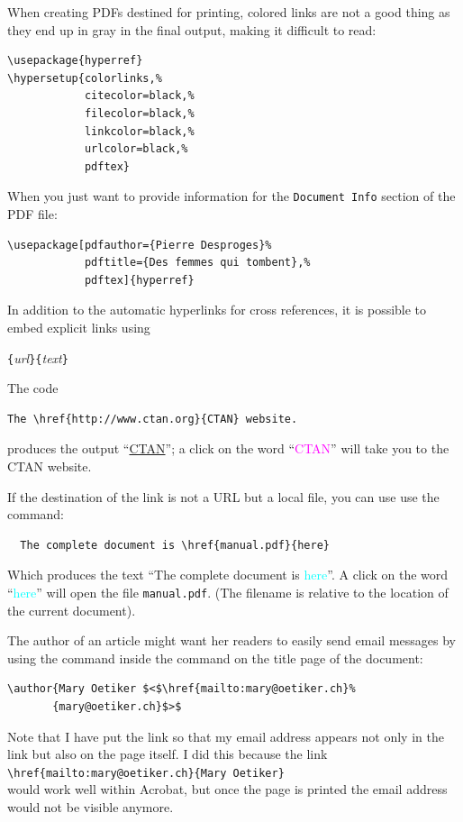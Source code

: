 \documentclass[twoside,11pt,letterpaper]{article}
\begin{document}
When creating PDFs destined for printing, colored links are not a
  good thing as they end up in gray in the final output, making it
  difficult to read:
\begin{code}
\begin{verbatim}
\usepackage{hyperref}
\hypersetup{colorlinks,%
            citecolor=black,%
            filecolor=black,%
            linkcolor=black,%
            urlcolor=black,%
            pdftex}
\end{verbatim}
\end{code}

When you just want to provide information for the
  \texttt{Document Info} section of the PDF file:
\begin{code}
\begin{verbatim}
\usepackage[pdfauthor={Pierre Desproges}%
            pdftitle={Des femmes qui tombent},%
            pdftex]{hyperref}
\end{verbatim}
\end{code}

\vspace{\baselineskip}

In addition to the automatic hyperlinks for cross references, it is
possible to embed explicit links using
\begin{lscommand}
\verb|{|\emph{url}\verb|}{|\emph{text}\verb|}|
\end{lscommand}

The code
\begin{code}
\begin{verbatim}
The \href{http://www.ctan.org}{CTAN} website.
\end{verbatim}
\end{code}
produces the output ``\href{http://www.ctan.org}{CTAN}'';
a click on the word ``\textcolor{magenta}{CTAN}''
will take you to the CTAN website.

If the destination of the link is not a URL but a local file,
  you can use use the  command: 
\begin{verbatim}
  The complete document is \href{manual.pdf}{here}
\end{verbatim}
Which produces the text ``The complete document is \textcolor{cyan}{here}''.
A click on the word
``\textcolor{cyan}{here}''
will open the file \texttt{manual.pdf}. (The filename is relative to
the location of the current document).

The author of an article might want her readers to easily send
  email messages by using the  command inside the 
  command on the title page of the document:
\begin{code}
\begin{verbatim}
\author{Mary Oetiker $<$\href{mailto:mary@oetiker.ch}%
       {mary@oetiker.ch}$>$
\end{verbatim}
\end{code}
Note that I have put the link so that my email address appears not only
in the link but also on the page itself. I did this because the
link\\
\verb+\href{mailto:mary@oetiker.ch}{Mary Oetiker}+\\
would
work well within Acrobat, but once the page is printed the email address
would not be visible anymore.
\end{document}
